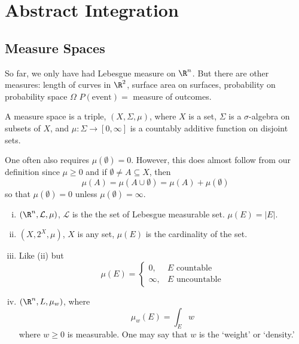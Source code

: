 \newpage
\section{Abstract Integration}
\subsection{Measure Spaces}

So far, we only have had Lebesgue measure on $\R^n$. But there are other measures: length of curves in $\R^2$, surface area on surfaces, probability on probability space $\Omega$ $P(\text{event})=$ measure of outcomes. 


\begin{dfn}
A measure space is a triple, $(X,\Sigma,\mu)$, where $X$ is a set, $\Sigma$ is a $\sigma$-algebra on subsets of $X$, and $\mu: \Sigma \to [0,\infty]$ is a countably additive function on disjoint sets. 
\end{dfn}


\begin{rem}
One often also requires $\mu(\emptyset)=0$. However, this does almost follow from our definition since $\mu \geq 0$ and if $\emptyset \neq A \subseteq X$, then 
	\[
	\mu(A)=\mu(A \cup \emptyset)= \mu(A) + \mu(\emptyset)
	\]
so that $\mu(\emptyset)=0$ unless $\mu(\emptyset)=\infty$.  
\end{rem}

\begin{ex} \hfill
\begin{enumerate}[(i)]
\item $(\R^n,\mathcal{L},\mu)$, $\mathcal{L}$ is the the set of Lebesgue measurable set. $\mu(E)=|E|$.

\item $(X,2^X,\mu)$, $X$ is any set, $\mu(E)$ is the cardinality of the set. 
\item Like (ii) but
	\[
	\mu(E)=
	\begin{cases}
	0, & E \text{ countable} \\
	\infty, & E \text{ uncountable}
	\end{cases}
	\]

\item $(\R^n,L,\mu_w)$, where
	\[
	\mu_w(E)= \int_E w
	\]
where $w \geq 0$ is measurable. One may say that $w$ is the `weight' or `density.'  %
\end{enumerate}
\end{ex}


